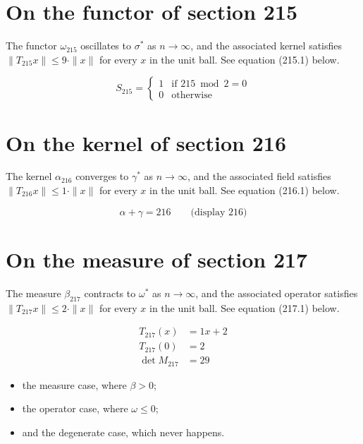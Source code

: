 \documentclass{article}
\begin{document}
\section{On the functor of section 215}
The functor $\omega_{215}$ oscillates to $\sigma^{*}$ as $n \to \infty$,
and the associated kernel satisfies $\|T_{215} x\| \leq 9 \cdot \|x\|$
for every $x$ in the unit ball. See equation (215.1) below.

\begin{equation}
S_{215} = \begin{cases} 1 & \text{if } 215 \bmod 2 = 0 \\ 0 & \text{otherwise} \end{cases}
\end{equation}

\section{On the kernel of section 216}
The kernel $\alpha_{216}$ converges to $\gamma^{*}$ as $n \to \infty$,
and the associated field satisfies $\|T_{216} x\| \leq 1 \cdot \|x\|$
for every $x$ in the unit ball. See equation (216.1) below.

$$
\alpha + \gamma = 216 \qquad \text{(display 216)}
$$

\section{On the measure of section 217}
The measure $\beta_{217}$ contracts to $\omega^{*}$ as $n \to \infty$,
and the associated operator satisfies $\|T_{217} x\| \leq 2 \cdot \|x\|$
for every $x$ in the unit ball. See equation (217.1) below.

\begin{align}
T_{217}(x) &= 1 x + 2 \\
T_{217}(0) &= 2 \\
\det M_{217} &= 29
\end{align}

\begin{itemize}
  \item the measure case, where $\beta > 0$;
  \item the operator case, where $\omega \leq 0$;
  \item and the degenerate case, which never happens.
\end{itemize}
\end{document}

